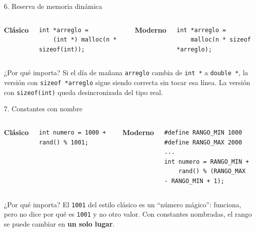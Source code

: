 \documentclass[aspectratio=169]{beamer}
\begin{document}
\begin{frame}[fragile]{6. Reserva de memoria dinámica}
    \begin{columns}[T]
        \textbf{Clásico}
        \begin{lstlisting}
int *arreglo =
    (int *) malloc(n * sizeof(int));
        \end{lstlisting}

        \textbf{Moderno}
        \begin{lstlisting}
int *arreglo =
    malloc(n * sizeof *arreglo);
        \end{lstlisting}
    \end{columns}

    \vspace{1em}
    \begin{alertblock}{¿Por qué importa?}
        Si el día de mañana \texttt{arreglo} cambia de \texttt{int *} a
        \texttt{double *}, la versión con \texttt{sizeof *arreglo} sigue
        siendo correcta sin tocar esa línea. La versión con
        \texttt{sizeof(int)} queda desincronizada del tipo real.
    \end{alertblock}
\end{frame}

\begin{frame}[fragile]{7. Constantes con nombre}
    \begin{columns}[T]
        \textbf{Clásico}
        \begin{lstlisting}
int numero = 1000 + rand() % 1001;
        \end{lstlisting}

        \textbf{Moderno}
        \begin{lstlisting}
#define RANGO_MIN 1000
#define RANGO_MAX 2000
...
int numero = RANGO_MIN +
    rand() % (RANGO_MAX - RANGO_MIN + 1);
        \end{lstlisting}
    \end{columns}

    \vspace{1em}
    \begin{alertblock}{¿Por qué importa?}
        El \texttt{1001} del estilo clásico es un ``número mágico'': funciona,
        pero no dice por qué es \texttt{1001} y no otro valor. Con constantes
        nombradas, el rango se puede cambiar en \textbf{un solo lugar}.
    \end{alertblock}
\end{frame}
\end{document}
